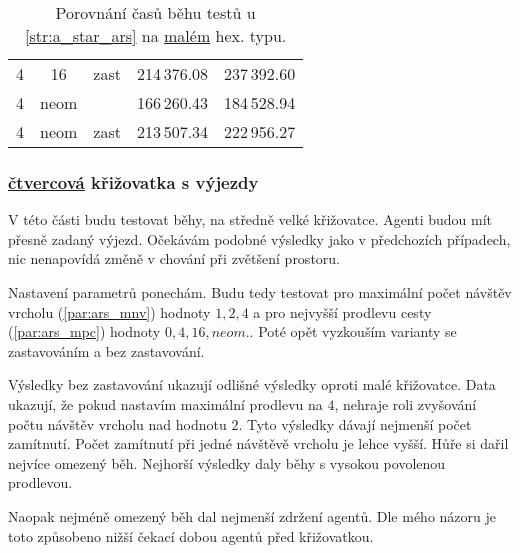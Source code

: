 \begin{table}[b!]
\begin{tabular}{c c c D{.}{,}{6.2}D{.}{,}{6.2}}
		4  & 16   & zast     & 214\,376.08                               & 237\,392.60                                \\
		4  & neom & \mc{---} & 166\,260.43                               & 184\,528.94                                \\
		4  & neom & zast     & 213\,507.34                               & 222\,956.27                                \\
	\end{tabular}
	\caption{Porovnání časů běhu testů u \ref{str:a_star_ars} na \hyperref[par:data_mala]{malém} hex. typu.}\label{tab:ars_exp_male_hexagonalni_casy}
\end{table}

\subsubsection{ \hyperref[subsec:ctvercovy_typ]{čtvercová} křižovatka s výjezdy}
\label{subsubsec:exp_ars_stredni_ctvercova_krizovatka_ex}

V této části budu testovat běhy, na středně velké křižovatce.
Agenti budou mít přesně zadaný výjezd.
Očekávám podobné výsledky jako v předchozích případech, nic nenapovídá změně v chování při zvětšení prostoru.

Nastavení parametrů ponechám.
Budu tedy testovat pro maximální počet návštěv vrcholu (\ref{par:ars_mnv}) hodnoty $1, 2, 4$
a pro nejvyšší prodlevu cesty (\ref{par:ars_mpc}) hodnoty $0, 4, 16, neom.$.
Poté opět vyzkouším varianty se zastavováním a bez zastavování.

Výsledky bez zastavování ukazují odlišné výsledky oproti malé křižovatce.
Data ukazují, že pokud nastavím maximální prodlevu na $4$, nehraje roli zvyšování počtu návštěv vrcholu nad hodnotu $2$.
Tyto výsledky dávají nejmenší počet zamítnutí.
Počet zamítnutí při jedné návštěvě vrcholu je lehce vyšší.
Hůře si dařil nejvíce omezený běh.
Nejhorší výsledky daly běhy s vysokou povolenou prodlevou.

Naopak nejméně omezený běh dal nejmenší zdržení agentů.
Dle mého názoru je toto způsobeno nižší čekací dobou agentů před křižovatkou.

